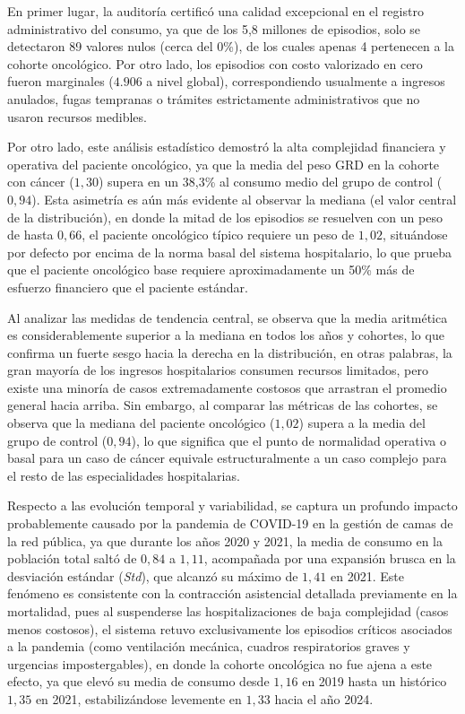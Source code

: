 En primer lugar, la auditoría certificó una calidad excepcional en el registro administrativo del consumo, ya que de los 5,8 millones de episodios, solo se detectaron 89 valores nulos (cerca del 0\%), de los cuales apenas 4 pertenecen a la cohorte oncológico. Por otro lado, los episodios con costo valorizado en cero fueron marginales ($4.906$ a nivel global), correspondiendo usualmente a ingresos anulados, fugas tempranas o trámites estrictamente administrativos que no usaron recursos medibles.

Por otro lado, este análisis estadístico demostró la alta complejidad financiera y operativa del paciente oncológico, ya que la media del peso GRD en la cohorte con cáncer ($1,30$) supera en un 38,3\% al consumo medio del grupo de control ($0,94$). Esta asimetría es aún más evidente al observar la mediana (el valor central de la distribución), en donde la mitad de los episodios se resuelven con un peso de hasta $0,66$, el paciente oncológico típico requiere un peso de $1,02$, situándose por defecto por encima de la norma basal del sistema hospitalario, lo que prueba que el paciente oncológico base requiere aproximadamente un 50\% más de esfuerzo financiero que el paciente estándar.

Al analizar las medidas de tendencia central, se observa que la media aritmética es considerablemente superior a la mediana en todos los años y cohortes, lo que confirma un fuerte sesgo hacia la derecha en la distribución, en otras palabras, la gran mayoría de los ingresos hospitalarios consumen recursos limitados, pero existe una minoría de casos extremadamente costosos que arrastran el promedio general hacia arriba. Sin embargo, al comparar las métricas de las cohortes, se observa que la mediana del paciente oncológico ($1,02$) supera a la media del grupo de control ($0,94$), lo que significa que el punto de normalidad operativa o basal para un caso de cáncer equivale estructuralmente a un caso complejo para el resto de las especialidades hospitalarias.

Respecto a las evolución temporal y variabilidad, se captura un profundo impacto probablemente causado por la pandemia de COVID-19 en la gestión de camas de la red pública, ya que durante los años 2020 y 2021, la media de consumo en la población total saltó de $0,84$ a $1,11$, acompañada por una expansión brusca en la desviación estándar (\textit{Std}), que alcanzó su máximo de $1,41$ en 2021. Este fenómeno es consistente con la contracción asistencial detallada previamente en la mortalidad, pues al suspenderse las hospitalizaciones de baja complejidad (casos menos costosos), el sistema retuvo exclusivamente los episodios críticos asociados a la pandemia (como ventilación mecánica, cuadros respiratorios graves y urgencias impostergables), en donde la cohorte oncológica no fue ajena a este efecto, ya que elevó su media de consumo desde $1,16$ en 2019 hasta un histórico $1,35$ en 2021, estabilizándose levemente en $1,33$ hacia el año 2024.

